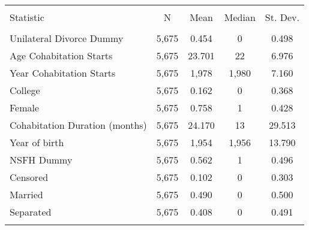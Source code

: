 
\begin{tabular}{@{\extracolsep{5pt}}lcccc} 
\\[-1.8ex]\hline 
\hline \\[-1.8ex] 
Statistic & \multicolumn{1}{c}{N} & \multicolumn{1}{c}{Mean} & \multicolumn{1}{c}{Median} & \multicolumn{1}{c}{St. Dev.} \\ 
\hline \\[-1.8ex] 
Unilateral Divorce  Dummy& 5,675 & 0.454 & 0 & 0.498 \\ 
Age Cohabitation Starts & 5,675 & 23.701 & 22 & 6.976 \\ 
Year Cohabitation Starts & 5,675 & 1,978 & 1,980 & 7.160 \\ 
College & 5,675 & 0.162 & 0 & 0.368 \\ 
Female & 5,675 & 0.758 & 1 & 0.428 \\ 
Cohabitation Duration (months)& 5,675 & 24.170 & 13 & 29.513 \\ 
Year of birth & 5,675 & 1,954 & 1,956 & 13.790 \\ 
NSFH Dummy& 5,675 & 0.562 & 1 & 0.496 \\ 
Censored & 5,675 & 0.102 & 0 & 0.303 \\ 
Married & 5,675 & 0.490 & 0 & 0.500 \\ 
Separated & 5,675 & 0.408 & 0 & 0.491 \\ 
\hline \\[-1.8ex] 
\end{tabular} 
